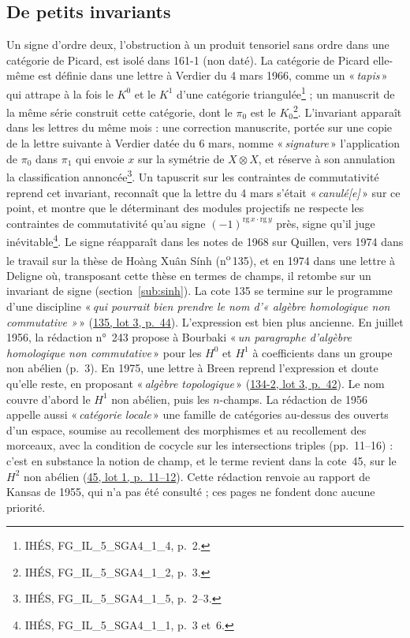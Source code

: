 \documentclass[11pt]{amsart}
\makeatletter
\newcommand{\q}[1]{«\,\textit{#1}\,»}
\newcommand{\cote}[1]{\mbox{n\textsuperscript{o}\,#1}}
\def\RHM@first#1--#2\@nil{#1}
\DeclareRobustCommand{\lot}[3]{\begingroup\edef\RHM@pdfpage{\the\numexpr\RHM@first#3--\@nil+1\relax}\href{https://grothendieck.umontpellier.fr/#1.pdf\#page=\RHM@pdfpage}{#1, lot #2, p.~#3}\endgroup}
\newcommand{\lot}[3]{\href{https://grothendieck.commutator.io/\##1/#2/p#3}{#1, lot #2, p.~#3}}
\makeatother
\begin{document}
\subsection{De petits invariants}\label{sub:invariants}

Un signe d'ordre deux, l'obstruction à un produit tensoriel sans ordre dans une catégorie de Picard, est isolé dans 161-1 (non daté). La catégorie de Picard elle-même est définie dans une lettre à Verdier du 4 mars 1966, comme un \q{tapis} qui attrape à la fois le $K^0$ et le $K^1$ d'une catégorie triangulée\footnote{IHÉS, FG\_IL\_5\_SGA4\_1\_4, p.~2.} ; un manuscrit de la même série construit cette catégorie, dont le $\pi_0$ est le $K_0$\footnote{IHÉS, FG\_IL\_5\_SGA4\_1\_2, p.~3.}. L'invariant apparaît dans les lettres du même mois : une correction manuscrite, portée sur une copie de la lettre suivante à Verdier datée du 6 mars, nomme \q{signature} l'application de $\pi_0$ dans $\pi_1$ qui envoie $x$ sur la symétrie de $X \otimes X$, et réserve à son annulation la classification annoncée\footnote{IHÉS, FG\_IL\_5\_SGA4\_1\_5, p.~2--3.}. Un tapuscrit sur les contraintes de commutativité reprend cet invariant, reconnaît que la lettre du 4 mars s'était \q{canulé[e]} sur ce point, et montre que le déterminant des modules projectifs ne respecte les contraintes de commutativité qu'au signe $(-1)^{\mathrm{rg}\,x \cdot \mathrm{rg}\,y}$ près, signe qu'il juge inévitable\footnote{IHÉS, FG\_IL\_5\_SGA4\_1\_1, p.~3 et~6.}. Le signe réapparaît dans les notes de 1968 sur Quillen, vers 1974 dans le travail sur la thèse de Hoàng Xuân Sính (\cote{135}), et en 1974 dans une lettre à Deligne où, transposant cette thèse en termes de champs, il retombe sur un invariant de signe (section~\ref{sub:sinh}). La cote 135 se termine sur le programme d'une discipline \q{qui pourrait bien prendre le nom d'« algèbre homologique non commutative »} (\lot{135}{3}{44}). L'expression est bien plus ancienne. En juillet 1956, la rédaction n°~243 propose à Bourbaki \q{un paragraphe d'algèbre homologique non commutative} pour les $H^0$ et $H^1$ à coefficients dans un groupe non abélien (p.~3). En 1975, une lettre à Breen reprend l'expression et doute qu'elle reste, en proposant \q{algèbre topologique} (\lot{134-2}{3}{42}). Le nom couvre d'abord le $H^1$ non abélien, puis les $n$-champs. La rédaction de 1956 appelle aussi \q{catégorie locale} une famille de catégories au-dessus des ouverts d'un espace, soumise au recollement des morphismes et au recollement des morceaux, avec la condition de cocycle sur les intersections triples (pp.~11--16) : c'est en substance la notion de champ, et le terme revient dans la cote~45, sur le $H^2$ non abélien (\lot{45}{1}{11--12}). Cette rédaction renvoie au rapport de Kansas de 1955, qui n'a pas été consulté ; ces pages ne fondent donc aucune priorité.
\end{document}
